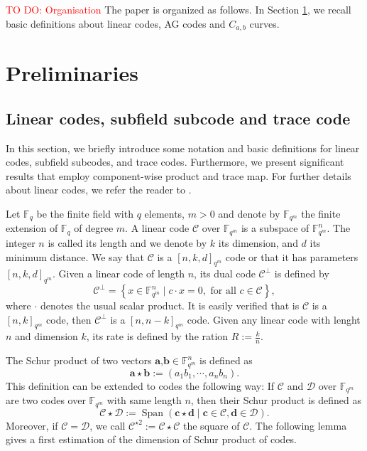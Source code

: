 \documentclass[a4paper]{article}
\theoremstyle{definition}
\theoremstyle{remark}
\newcommand{\calC}{\mathcal{C}}
\newcommand{\calD}{\mathcal{D}}
\newcommand{\fqm}{\mathbb{F}_{q^m}}
\newcommand{\fq}{\mathbb{F}_{q}}
\newcommand{\Span}[1]{\operatorname{Span}\left(#1\right)}
\newcommand\TODO[1]{\textcolor{red}{TO DO: #1}}
\begin{document}
\TODO{Organisation}
The paper is organized as follows. In Section \ref{sec:preli}, we recall basic definitions about linear codes, AG codes and $C_{a,b}$ curves.


\section{Preliminaries}\label{sec:preli}

\subsection{Linear codes, subfield subcode and trace code}


In this section, we briefly introduce some notation and basic definitions for linear codes, subfield subcodes, and trace codes. Furthermore, we present significant results that employ component-wise product and trace map. For further details about linear codes, we refer the reader to \cite{MS86}.

\noindent Let $\fq$ be the finite field with $q$ elements, $m > 0$ and denote  by $\fqm$ the finite extension of $\fq$ of degree $m$. A linear code $\calC$ over $\fqm$ is a subspace of $\fqm^n$. The integer $n$ is called its length and we denote by $k$ its dimension, and $d$ its minimum distance. We say that $\calC$ is a $[n,k,d]_{q^m}$ code or that it has parameters $[n,k,d]_{q^m}$. Given a linear code of length $n$, its dual code $\calC^{\perp}$ is defined by 
\[\calC^{\perp}=\left\lbrace x \in \fqm^n \mid c \cdot x=0, \text{ for all } c \in \calC \right\rbrace,\]  
where $\cdot$ denotes the usual scalar product. It is easily verified that is $\calC$ is a $[n,k]_{q^m}$ code, then $\calC^{\perp}$ is a $[n,n-k]_{q^m}$ code.
Given any linear code with lenght $n$ and dimension $k$, its rate is defined by the ration $R := \frac{k}{n}$.

\noindent The Schur product of two vectors $\mathbf{a}$,$\mathbf{b} \in \fqm^n$ is defined as 
\[ \mathbf{a} \star \mathbf{b} := (a_1b_1,\cdots,a_nb_n). \]
This definition can be extended to codes the following way: If $\calC$ and $\calD$ over $\fqm$ are two codes over $\fqm$ with same length $n$, then their Schur product is defined as
\[ \calC \star \calD := \Span{\mathbf{c} \star \mathbf{d} \mid \mathbf{c} \in \calC, \mathbf{d} \in \calD}. \]
Moreover, if $\calC = \calD$, we call $\calC^{\star 2} := \calC \star \calC$ the square of $\calC$. The following lemma gives a first estimation of the dimension of Schur product of codes.
\end{document}
